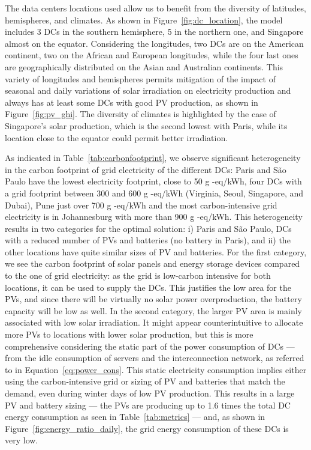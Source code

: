 The data centers locations used allow us to benefit from the diversity of latitudes, hemispheres, and climates. As shown in Figure~\ref{fig:dc_location}, the model includes 3 DCs in the southern hemisphere, 5 in the northern one, and Singapore almost on the equator. Considering the longitudes, two DCs are on the American continent, two on the African and European longitudes, while the four last ones are geographically distributed on the Asian and Australian continents. This variety of longitudes and hemispheres permits mitigation of the impact of seasonal and daily variations of solar irradiation on electricity production and always has at least some DCs with good PV production, as shown in Figure~\ref{fig:pv_ghi}. The diversity of climates is highlighted by the case of Singapore's solar production, which is the second lowest with Paris, while its location close to the equator could permit better irradiation.


As indicated in Table~\ref{tab:carbonfootprint}, we observe significant heterogeneity in the carbon footprint of grid electricity of the different DCs: Paris and S\~ao Paulo have the lowest electricity footprint, close to 50 g -eq/kWh, four DCs with a grid footprint between 300 and 600 g -eq/kWh (Virginia, Seoul, Singapore, and Dubai), Pune just over 700 g -eq/kWh and the most carbon-intensive grid electricity is in Johannesburg with more than 900 g -eq/kWh. This heterogeneity results in two categories for the optimal solution: i) Paris and S\~ao Paulo, DCs with a reduced number of PVs and batteries (no battery in Paris), and ii) the other locations have quite similar sizes of PV and batteries. For the first category, we see the carbon footprint of solar panels and energy storage devices compared to the one of grid electricity: as the grid is low-carbon intensive for both locations, it can be used to supply the DCs. This justifies the low area for the PVs, and since there will be virtually no solar power overproduction, the battery capacity will be low as well. In the second category, the larger PV area is mainly associated with low solar irradiation. It might appear counterintuitive to allocate more PVs to locations with lower solar production, but this is more comprehensive considering the static part of the power consumption of DCs  --- from the idle consumption of servers and the interconnection network, as referred to in Equation~\eqref{eq:power_cons}. This static electricity consumption implies either using the carbon-intensive grid or sizing of PV and batteries that match the demand, even during winter days of low PV production. This results in a large PV and battery sizing --- the PVs are producing up to 1.6 times the total DC energy consumption as seen in Table~\ref{tab:metrics} --- and, as shown in Figure~\ref{fig:energy_ratio_daily}, the grid energy consumption of these DCs is very low. 

